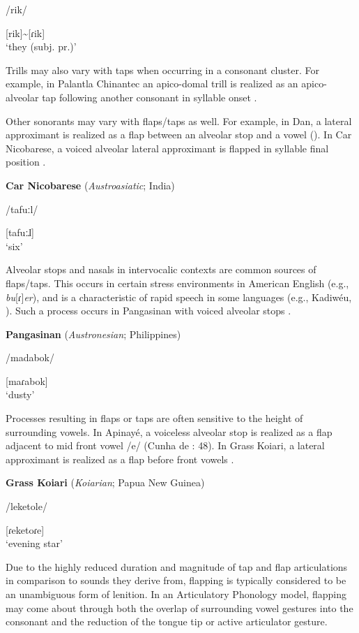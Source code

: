 /rik/

[rik]{\textasciitilde}[ɾik]\\
\glt ‘they (subj. pr.)’
\citep[14]{Beaumont1979}
\z

Trills may also vary with taps when occurring in a consonant cluster. For example, in Palantla Chinantec an apico-domal trill is realized as an apico-alveolar tap following another consonant in syllable onset \citep[3]{Merrifield1963}. 

  Other sonorants may vary with flaps/taps as well. For example, in Dan, a lateral approximant is realized as a flap between an alveolar stop and a vowel (\citealt{BearthZemp1967}). In Car Nicobarese, a voiced alveolar lateral approximant is flapped in syllable final position .

\ea\label{ex:4.53}
  \textbf{Car Nicobarese} (\textit{Austroasiatic}; India)

/tafuːl/

[tafuːɺ]\\
\glt ‘six’
\citep[45]{Braine1970}
\z

  Alveolar stops and nasals in intervocalic contexts are common sources of flaps/taps. This occurs in certain stress environments in American English (e.g., \textit{bu}[ɾ]\textit{er}), and is a characteristic of rapid speech in some languages (e.g., Kadiwéu, \citealt{Sandalo1997}). Such a process occurs in Pangasinan with voiced alveolar stops .

\ea\label{ex:4.54}
  \textbf{Pangasinan} (\textit{Austronesian}; Philippines)

/madabok/

[maɾabok]\\
\glt ‘dusty’
\citep[18]{Benton1971}
\z

  Processes resulting in flaps or taps are often sensitive to the height of surrounding vowels. In Apinayé, a voiceless alveolar stop is realized as a flap adjacent to mid front vowel /e/ (Cunha de \citealt{Oliveira2005}: 48). In Grass Koiari, a lateral approximant is realized as a flap before front vowels .

\ea\label{ex:4.55}
  \textbf{Grass Koiari} (\textit{Koiarian}; Papua New Guinea)

/leketole/

[ɾeketoɾe]\\
\glt ‘evening star’
\citep[6]{Dutton1996}
\z

  Due to the highly reduced duration and magnitude of tap and flap articulations in comparison to sounds they derive from, flapping is typically considered to be an unambiguous form of lenition. In an Articulatory Phonology model, flapping may come about through both the overlap of surrounding vowel gestures into the consonant and the reduction of the tongue tip or active articulator gesture. 

